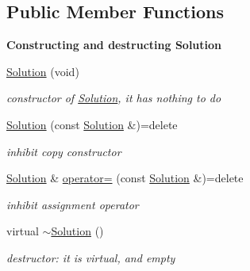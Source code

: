 \subsection*{Public Member Functions}
\begin{Indent}\textbf{ Constructing and destructing Solution}\par
\begin{DoxyCompactItemize}
\item 
\mbox{\label{class_s_m_spp__di__unipi__it_1_1_solution_aa932f0b385415ce18403bc8fd09117b1}} 
\mbox{\hyperlink{class_s_m_spp__di__unipi__it_1_1_solution_aa932f0b385415ce18403bc8fd09117b1}{Solution}} (void)
\begin{DoxyCompactList}\small\item\em constructor of \mbox{\hyperlink{class_s_m_spp__di__unipi__it_1_1_solution}{Solution}}, it has nothing to do \end{DoxyCompactList}\item 
\mbox{\label{class_s_m_spp__di__unipi__it_1_1_solution_ac31e2914516dcf07f2baad62c668e1fe}} 
\mbox{\hyperlink{class_s_m_spp__di__unipi__it_1_1_solution_ac31e2914516dcf07f2baad62c668e1fe}{Solution}} (const \mbox{\hyperlink{class_s_m_spp__di__unipi__it_1_1_solution}{Solution}} \&)=delete
\begin{DoxyCompactList}\small\item\em inhibit copy constructor \end{DoxyCompactList}\item 
\mbox{\label{class_s_m_spp__di__unipi__it_1_1_solution_a183b45ef1ddc1c426fea886167d83ab5}} 
\mbox{\hyperlink{class_s_m_spp__di__unipi__it_1_1_solution}{Solution}} \& \mbox{\hyperlink{class_s_m_spp__di__unipi__it_1_1_solution_a183b45ef1ddc1c426fea886167d83ab5}{operator=}} (const \mbox{\hyperlink{class_s_m_spp__di__unipi__it_1_1_solution}{Solution}} \&)=delete
\begin{DoxyCompactList}\small\item\em inhibit assignment operator \end{DoxyCompactList}\item 
\mbox{\label{class_s_m_spp__di__unipi__it_1_1_solution_a2c3b691d53d01a74ebfbb4653e4e94e4}} 
virtual \mbox{\hyperlink{class_s_m_spp__di__unipi__it_1_1_solution_a2c3b691d53d01a74ebfbb4653e4e94e4}{$\sim$\+Solution}} ()
\begin{DoxyCompactList}\small\item\em destructor\+: it is virtual, and empty \end{DoxyCompactList}\end{DoxyCompactItemize}
\end{Indent}
